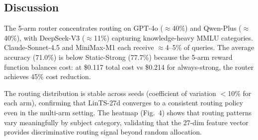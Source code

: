 \subsection{Discussion}

The 5-arm router concentrates routing on GPT-4o ($\approx$40\%) and Qwen-Plus ($\approx$40\%), with DeepSeek-V3 ($\approx$11\%) capturing knowledge-heavy MMLU categories.
Claude-Sonnet-4.5 and MiniMax-M1 each receive $\approx$4--5\% of queries.
The average accuracy (71.0\%) is below Static-Strong (77.7\%) because the 5-arm reward function balances cost: at \$0.117 total cost vs \$0.214 for always-strong, the router achieves 45\% cost reduction.

The routing distribution is stable across seeds (coefficient of variation $<$10\% for each arm), confirming that LinTS-27d converges to a consistent routing policy even in the multi-arm setting.
The heatmap (Fig.~4) shows that routing patterns vary meaningfully by subject category, validating that the 27-dim feature vector provides discriminative routing signal beyond random allocation.
